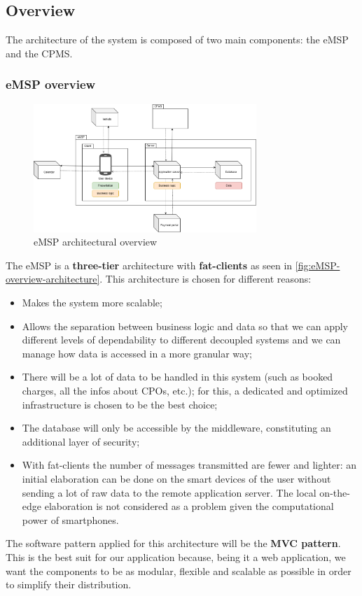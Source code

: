 
\subsection{Overview}
The architecture of the system is composed of two main components: the \ac{eMSP} and the \ac{CPMS}.

\subsubsection{\ac{eMSP} overview}

\begin{figure}[!h]
    \begin{center}
        \includegraphics[keepaspectratio, width=0.75\textwidth]{Graphics/DD-eMSP-overview.drawio.png}
        \caption{\ac{eMSP} architectural overview}
        \label{fig:eMSP-overview-architecture}
    \end{center}
\end{figure}

The \ac{eMSP} is a \textbf{three-tier} architecture with \textbf{fat-clients} as seen in \autoref{fig:eMSP-overview-architecture}. This architecture is chosen for different reasons:
\begin{itemize}
    \item Makes the system more scalable;
    \item Allows the separation between business logic and data so that we can apply different levels of dependability to different decoupled systems and we can manage how data is accessed in a more granular way;
    \item There will be a lot of data to be handled in this system (such as booked charges, all the infos about \acp{CPO}, etc.); for this, a dedicated and optimized infrastructure is chosen to be the best choice;
    \item The database will only be accessible by the middleware, constituting an additional layer of security;
    \item With fat-clients the number of messages transmitted are fewer and lighter: an initial elaboration can be done on the smart devices of the user without sending a lot of raw data to the remote application server. The local on-the-edge elaboration is not considered as a problem given the computational power of smartphones.
\end{itemize}
The software pattern applied for this architecture will be the \textbf{\ac{MVC} pattern}. This is the best suit for our application because, being it a web application, we want the components to be as modular, flexible and scalable as possible in order to simplify their distribution.

